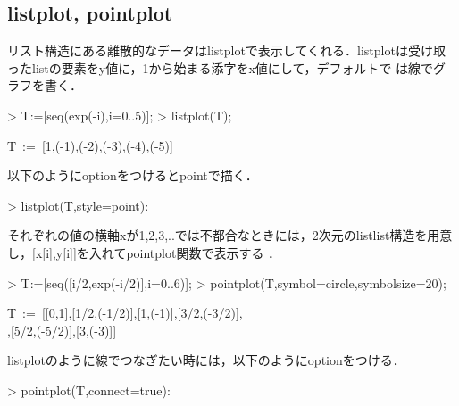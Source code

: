 \subsection{listplot, pointplot}
リスト構造にある離散的なデータはlistplotで表示してくれる．listplotは受け取ったlistの要素をy値に，1から始まる添字をx値にして，デフォルトで
は線でグラフを書く．
\begin{MapleInput}
> T:=[seq(exp(-i),i=0..5)]; 
> listplot(T);
\end{MapleInput}
\begin{MapleOutput}
T\, := \,[1,\exp(-1),\exp(-2),\exp(-3),\exp(-4),\exp(-5)]
\end{MapleOutput}

以下のようにoptionをつけるとpointで描く．
\begin{MapleInput}
> listplot(T,style=point):
\end{MapleInput}

それぞれの値の横軸xが1,2,3,..では不都合なときには，2次元のlistlist構造を用意し，[x[i],y[i]]を入れてpointplot関数で表示する
．
\begin{MapleInput}
> T:=[seq([i/2,exp(-i/2)],i=0..6)]; 
> pointplot(T,symbol=circle,symbolsize=20);
\end{MapleInput}
\begin{MapleOutputGather}
T\, := \,[[0,1],[1/2,\exp(-1/2)],[1,\exp(-1)],[3/2,\exp(-3/2)], \notag \\
[2,\exp(-2)],[5/2,\exp(-5/2)],[3,\exp(-3)]]
\end{MapleOutputGather}


listplotのように線でつなぎたい時には，以下のようにoptionをつける．
\begin{MapleInput}
> pointplot(T,connect=true):
\end{MapleInput}


